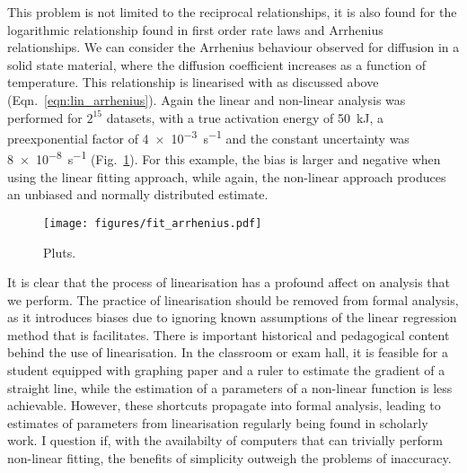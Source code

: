 \documentclass[reprint,superscriptaddress,nobibnotes,amsmath,amssymb]{revtex4-2}
\begin{document}
This problem is not limited to the reciprocal relationships, it is also found for the logarithmic relationship found in first order rate laws and Arrhenius relationships. 
We can consider the Arrhenius behaviour observed for diffusion in a solid state material, where the diffusion coefficient increases as a function of temperature. 
This relationship is linearised with as discussed above (Eqn.~\ref{eqn:lin_arrhenius}). 
Again the linear and non-linear analysis was performed for $2^15$ datasets, with a true activation energy of \SI{50}{\kilo\joule}, a preexponential factor of \SI{4e-3}{\second^{-1}} and the constant uncertainty was \SI{8e-8}{\second^{-1}} (Fig.~\ref{fig:fit_arrhenius}).
For this example, the bias is larger and negative when using the linear fitting approach, while again, the non-linear approach produces an unbiased and normally distributed estimate. 
%
\begin{figure}
  \texttt{[image: figures/fit\_arrhenius.pdf]}
  \caption{
    Pluts.
    }
  \label{fig:fit_arrhenius}
\end{figure}
%

It is clear that the process of linearisation has a profound affect on analysis that we perform. 
The practice of linearisation should be removed from formal analysis, as it introduces biases due to ignoring known assumptions of the linear regression method that is facilitates. 
There is important historical and pedagogical content behind the use of linearisation. 
In the classroom or exam hall, it is feasible for a student equipped with graphing paper and a ruler to estimate the gradient of a straight line, while the estimation of a parameters of a non-linear function is less achievable. 
However, these shortcuts propagate into formal analysis, leading to estimates of parameters from linearisation regularly being found in scholarly work. 
I question if, with the availabilty of computers that can trivially perform non-linear fitting, the benefits of simplicity outweigh the problems of inaccuracy.



\end{document}
